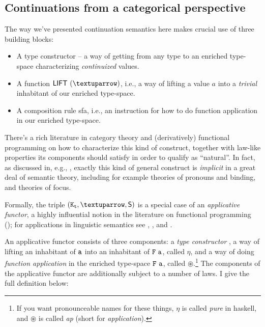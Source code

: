 \documentclass[nols,twoside,nofonts,nobib,nohyper]{tufte-handout}
\begin{document}
\begin{appendices}

  \section{Continuations from a categorical perspective}

  The way we've presented continuation semantics here makes crucial use of three
  building blocks:

  \begin{itemize}

      \item A type
  constructor  -- a way of getting from any type  to an
      enriched type-space characterizing \textit{continuized} values.

      \item A function $\ml{LIFT} (↑)$, i.e., a way of lifting a value $a$ into a
      \textit{trivial} inhabitant of our enriched type-space.

      \item A composition rule \acf{sfa}, i.e., an
  instruction for how to do function application in our enriched type-space.

      \end{itemize}

  There's a rich literature in category theory and (derivatively) functional
  programming on how to characterize this kind of construct, together with
  law-like properties its components should satisfy in order to qualify as
  \enquote{natural}. In fact, as discussed in, e.g.,
  \cite{charlow2018,elliott2019applicatives}, exactly this kind of general
  construct is \textit{implicit} in a great deal of semantic theory, including
  for example theories of pronouns and binding, and theories of focus.

  Formally, the triple $(\type{K_{t}},↑,\ml{S})$ is a special case of an \textit{applicative functor}, a
  highly influential notion in the literature on functional programming
  (\citealt{mcbridePaterson2008}); for applications in linguistic semantics see
  \cite{kiselyov2017}, \cite{charlow2018}, and \cite{elliott2019applicatives}.

  An applicative functor consists of three components: a \textit{type
    constructor} , a way of lifting an inhabitant of $\mathtt{a}$ into an
  inhabitant of $\type{F a}$, called $η$, and a way of doing \textit{function
    application} in the enriched type-space $\type{F a}$, called
  $⊛$.\footnote{If you want pronounceable names for these things, $η$ is called
    \textit{pure} in haskell, and $⊛$ is called \textit{ap} (short for
    \textit{application}).} The components of the applicative functor are
  additionally subject to a number of laws. I give the full definition below:


\end{appendices}
\end{document}

